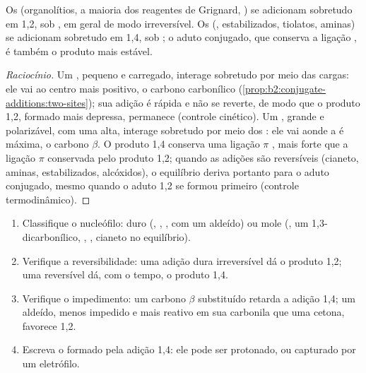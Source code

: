 \begin{proposition}\label{prop:b2:conjugate-additions:regio}
Os  (organolítios, a maioria dos reagentes de Grignard, ) se adicionam
sobretudo em 1,2, sob , em geral de modo irreversível. Os 
(,  estabilizados, tiolatos, aminas) se adicionam sobretudo em 1,4, sob
; o aduto conjugado, que conserva a ligação , é também o produto mais estável.
\end{proposition}

\begin{proof}[Raciocínio]
Um , pequeno e carregado, interage sobretudo por meio das cargas: ele vai ao centro
mais positivo, o carbono carbonílico (\cref{prop:b2:conjugate-additions:two-sites}); sua adição é
rápida e não se reverte, de modo que o produto 1,2, formado mais depressa, permanece (controle
cinético). Um , grande e polarizável, com uma  alta, interage sobretudo por meio
dos : ele vai aonde a  é máxima, o carbono $\beta$. O produto 1,4 conserva
uma ligação $\pi$ , mais forte que a ligação $\pi$  conservada pelo produto 1,2;
quando as adições são reversíveis (cianeto, aminas,  estabilizados, alcóxidos), o equilíbrio
deriva portanto para o aduto conjugado, mesmo quando o aduto 1,2 se formou primeiro (controle
termodinâmico).
\end{proof}

\begin{method}\label{met:b2:conjugate-additions:predict-mode}
\begin{enumerate}
  \item Classifique o nucleófilo: duro (, , ,  com um aldeído)
        ou mole (, um  1,3-dicarbonílico, , , cianeto no equilíbrio).
  \item Verifique a reversibilidade: uma adição dura irreversível dá o produto 1,2; uma reversível dá,
        com o tempo, o produto 1,4.
  \item Verifique o impedimento: um carbono $\beta$ substituído retarda a adição 1,4; um aldeído, menos
        impedido e mais reativo em sua carbonila que uma cetona, favorece 1,2.
  \item Escreva o  formado pela adição 1,4: ele pode ser protonado, ou capturado por um
        eletrófilo.
\end{enumerate}
\end{method}

